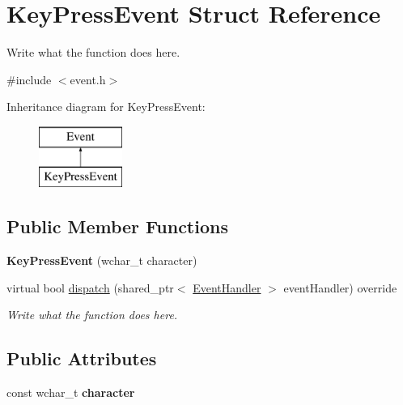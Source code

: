 \hypertarget{structKeyPressEvent}{\section{Key\+Press\+Event Struct Reference}
\label{structKeyPressEvent}
}


Write what the function does here.  




{\ttfamily \#include $<$event.\+h$>$}

Inheritance diagram for Key\+Press\+Event\+:\begin{figure}[H]
\begin{center}
\leavevmode
\includegraphics[height=2.000000cm]{structKeyPressEvent}
\end{center}
\end{figure}
\subsection*{Public Member Functions}
\begin{DoxyCompactItemize}
\item 
\hypertarget{structKeyPressEvent_a4d9766496d06b53ba5b594ed922082a8}{{\bfseries Key\+Press\+Event} (wchar\+\_\+t character)}\label{structKeyPressEvent_a4d9766496d06b53ba5b594ed922082a8}

\item 
virtual bool \hyperlink{structKeyPressEvent_a1c0e591880a4e20864a5d910e062c7fb}{dispatch} (shared\+\_\+ptr$<$ \hyperlink{structEventHandler}{Event\+Handler} $>$ event\+Handler) override
\begin{DoxyCompactList}\small\item\em Write what the function does here. \end{DoxyCompactList}\end{DoxyCompactItemize}
\subsection*{Public Attributes}
\begin{DoxyCompactItemize}
\item 
\hypertarget{structKeyPressEvent_a07fd7ffa0d7ab155ecaaed3cfb087b43}{const wchar\+\_\+t {\bfseries character}}\label{structKeyPressEvent_a07fd7ffa0d7ab155ecaaed3cfb087b43}

\end{DoxyCompactItemize}
